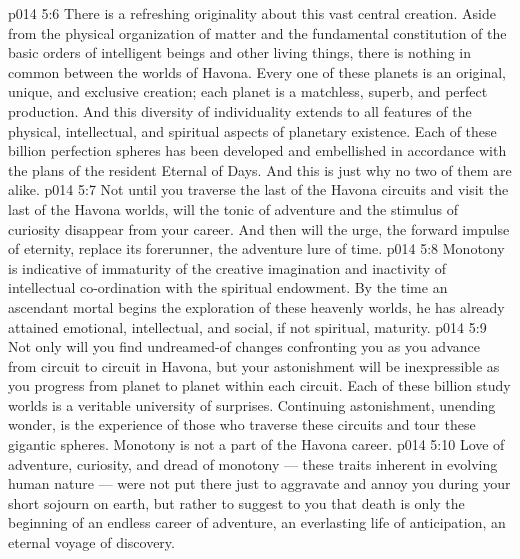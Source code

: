 \vs p014 5:6 \pc There is a refreshing originality about this vast central creation. Aside from the physical organization of matter and the fundamental constitution of the basic orders of intelligent beings and other living things, there is nothing in common between the worlds of Havona. Every one of these planets is an original, unique, and exclusive creation; each planet is a matchless, superb, and perfect production. And this diversity of individuality extends to all features of the physical, intellectual, and spiritual aspects of planetary existence. Each of these billion perfection spheres has been developed and embellished in accordance with the plans of the resident Eternal of Days. And this is just why no two of them are alike.
\vs p014 5:7 Not until you traverse the last of the Havona circuits and visit the last of the Havona worlds, will the tonic of adventure and the stimulus of curiosity disappear from your career. And then will the urge, the forward impulse of eternity, replace its forerunner, the adventure lure of time.
\vs p014 5:8 Monotony is indicative of immaturity of the creative imagination and inactivity of intellectual co\hyp{}ordination with the spiritual endowment. By the time an ascendant mortal begins the exploration of these heavenly worlds, he has already attained emotional, intellectual, and social, if not spiritual, maturity.
\vs p014 5:9 Not only will you find undreamed\hyp{}of changes confronting you as you advance from circuit to circuit in Havona, but your astonishment will be inexpressible as you progress from planet to planet within each circuit. Each of these billion study worlds is a veritable university of surprises. Continuing astonishment, unending wonder, is the experience of those who traverse these circuits and tour these gigantic spheres. Monotony is not a part of the Havona career.
\vs p014 5:10 Love of adventure, curiosity, and dread of monotony --- these traits inherent in evolving human nature --- were not put there just to aggravate and annoy you during your short sojourn on earth, but rather to suggest to you that death is only the beginning of an endless career of adventure, an everlasting life of anticipation, an eternal voyage of discovery.
